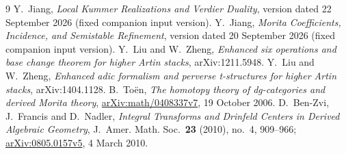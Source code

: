 \documentclass[11pt]{article}
\theoremstyle{definition}
\theoremstyle{remark}
\begin{document}
\begin{thebibliography}{9}
 Y.~Jiang,
\emph{Local Kummer Realizations and Verdier Duality},
version dated 22 September 2026 (fixed companion input version).
 Y.~Jiang,
\emph{Morita Coefficients, Incidence, and Semistable Refinement},
version dated 20 September 2026 (fixed companion input version).
 Y.~Liu and W.~Zheng,
\emph{Enhanced six operations and base change theorem for higher
Artin stacks}, arXiv:1211.5948.
 Y.~Liu and W.~Zheng,
\emph{Enhanced adic formalism and perverse t-structures for higher
Artin stacks}, arXiv:1404.1128.
 B.~To\"en,
\emph{The homotopy theory of dg-categories and derived Morita theory},
\href{https://arxiv.org/abs/math/0408337v7}{arXiv:math/0408337v7},
19 October 2006.
 D.~Ben-Zvi, J.~Francis and D.~Nadler,
\emph{Integral Transforms and Drinfeld Centers in Derived Algebraic
Geometry}, J.~Amer. Math. Soc.\ \textbf{23} (2010), no.~4, 909--966;
\href{https://arxiv.org/abs/0805.0157v5}{arXiv:0805.0157v5},
4 March 2010.
\end{thebibliography}
\end{document}
